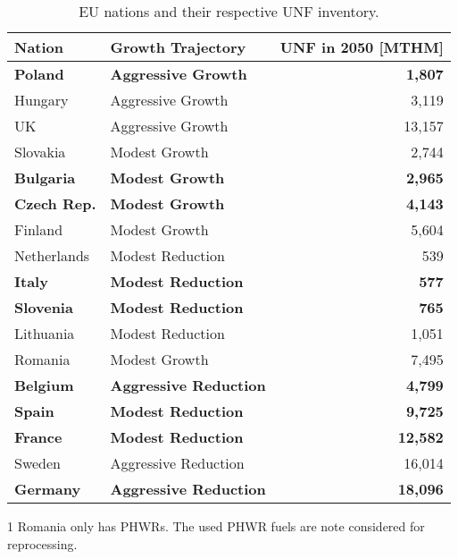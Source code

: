 \begin{table}[h]

\begin{threeparttable}
    \centering
    \caption {\gls{EU} nations and their respective \gls{UNF} inventory.} 
                \begin{tabularx}{\textwidth}{llr}
                    \hline 
                    \textbf{Nation} & \textbf{Growth Trajectory} & \small{\textbf{UNF in 2050 [MTHM] }}\\
                    \hline
                    \textbf{Poland} & \textbf{Aggressive Growth} & \textbf{1,807}\\
                    Hungary & Aggressive Growth & 3,119 \\ 
                    UK & Aggressive Growth & 13,157\\
                    Slovakia & Modest Growth & 2,744\\
                    \textbf{Bulgaria} & \textbf{Modest Growth} & \textbf{2,965} \\
                    \textbf{Czech Rep.} & \textbf{Modest Growth} & \textbf{4,143}\\
                    Finland & Modest Growth &  5,604\\
                    Netherlands & Modest Reduction & 539\\
                    \textbf{Italy} & \textbf{Modest Reduction} & \textbf{577}\\
                    \textbf{Slovenia} & \textbf{Modest Reduction} & \textbf{765}\\
                    Lithuania & Modest Reduction & 1,051 \\
                    Romania \tnote{1}  & Modest Growth & 7,495 \\
                    \textbf{Belgium} & \textbf{Aggressive Reduction} & \textbf{4,799}\\
                    \textbf{Spain} & \textbf{Modest Reduction} &  \textbf{9,725} \\
                    \textbf{France} & \textbf{Modest Reduction} & \textbf{12,582} \\
                    Sweden & Aggressive Reduction & 16,014\\
                    \textbf{Germany} & \textbf{Aggressive Reduction} & \textbf{18,096}\\
                    \hline
                \end{tabularx}
    \begin{tablenotes}
    \item[1] Romania only has \glspl{PHWR}. The used \gls{PHWR} fuels are note
             considered for reprocessing.
    \end{tablenotes}

    \label{tab:which_send}

\end{threeparttable}

\end{table}


